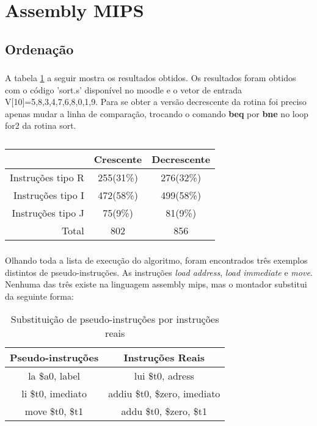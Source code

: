 \section{Assembly MIPS}

\subsection{Ordenação}

\subsubsection{}
\paragraph{} A tabela \ref{tab:Aquest1-a} a seguir mostra os resultados obtidos. Os resultados
foram obtidos com o código 'sort.s' disponível no moodle e o vetor de
entrada V[10]={5,8,3,4,7,6,8,0,1,9}. Para se obter a versão
decrescente da rotina foi preciso apenas mudar a linha de comparação, trocando o
comando \textbf{beq} por \textbf{bne} no loop for2 da rotina sort.

\begin{table}[H]
	\centering 
	\begin{tabular}{|r|c|c|}\hline
							& Crescente & Decrescente \\ \hline
		Instruções tipo R 	& 	255(31\%)		& 276(32\%) \\ \hline
		Instruções tipo I 	& 	472(58\%)		& 499(58\%) \\ \hline
		Instruções tipo J 	& 	75(9\%)		& 81(9\%) \\ \hline
		Total 				&	802 	& 856 \\ \hline
	\end{tabular}
	\caption{}
	\label{tab:Aquest1-a}
\end{table}

\subsubsection{}
\paragraph{} Olhando toda a lista de execução do algoritmo, foram encontrados três exemplos distintos de pseudo-instruções. As instruções \emph{load address}, \emph{load immediate} e \emph{move}. Nenhuma das três existe na linguagem assembly mips, mas o montador substitui da seguinte forma:
\begin{table}[H]
	\centering 
	\begin{tabular}{|c|c|}\hline
	Pseudo-instruções 	& Instruções Reais \\ \hline
	la \$a0, label 		&	lui \$t0, adress \\ \hline
	li \$t0, imediato	&	addiu \$t0, \$zero, imediato \\ \hline
	move \$t0, \$t1		&	addu \$t0, \$zero, \$t1 \\ \hline
	\end{tabular}
	\caption{Substituição de pseudo-instruções por instruções reais}
\end{table}
